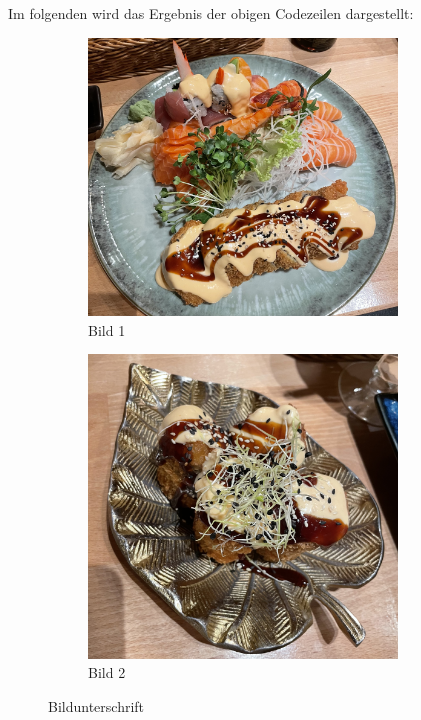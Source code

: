 Im folgenden wird das Ergebnis der obigen Codezeilen dargestellt:

\begin{figure}[H]
    \centering
    \begin{subfigure}{0.45\textwidth}
        \centering
        \includegraphics[width=0.9\textwidth]{anlagen/bilder/Bild1.jpg}
        \caption{Bild 1}
        \label{fig:bild1}
    \end{subfigure}
    \hfill
    \begin{subfigure}{0.45\textwidth}
        \centering
        \includegraphics[width=0.9\textwidth]{anlagen/bilder/Bild2.jpg}
        \caption{Bild 2}
        \label{fig:bild2}
    \end{subfigure}
    \caption{Bildunterschrift}
    \label{fig:bilder}
\end{figure}

